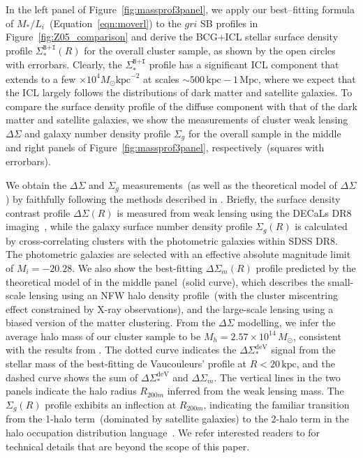 \documentclass[fleqn,usenatbib]{mnras}
\newcommand{\sigbi}{\Sigma_*^{\texttt{B+I}}}
\newcommand{\sigg}{\Sigma_g}
\newcommand{\mh}{M_h}
\newcommand{\mpc}{\mathrm{Mpc}}
\newcommand{\kpc}{\mathrm{kpc}}
\newcommand{\msol}{M_{\odot}}
\newcommand{\ds}{\Delta\Sigma}
\begin{document}
In the left panel of Figure~\ref{fig:massprof3panel}, we apply our
best--fitting formula of $M_*/L_i$~(Equation~\ref{eqn:moverl}) to the $gri$
SB profiles in Figure~\ref{fig:Z05_comparison} and derive the BCG+ICL
stellar surface density profile $\sigbi(R)$ for the overall cluster sample,
as shown by the open circles with errorbars. Clearly, the $\sigbi$ profile
has a significant ICL component that extends to a few ${\times}10^4
\msol\kpc^{-2}$ at scales ${\sim}500\,\kpc{-}1\,\mpc$, where we expect that
the ICL largely follows the distributions of dark matter and satellite
galaxies. To compare the surface density profile of the diffuse component
with that of the dark matter and satellite galaxies, we show the
measurements of cluster weak lensing $\ds$ and galaxy number density
profile $\sigg$ for the overall sample in the middle and right panels of
Figure~\ref{fig:massprof3panel}, respectively~(squares with errorbars).


We obtain the $\ds$ and $\sigg$ measurements~(as well as the theoretical
model of $\ds$) by faithfully following the methods described in
.  Briefly, the surface density contrast profile
$\ds(R)$ is measured from weak lensing using the DECaLs DR8
imaging~\citep{Dey2019}, while the galaxy surface number density profile
$\sigg(R)$ is calculated by cross-correlating clusters with the photometric
galaxies within SDSS DR8. The photometric galaxies are selected with an
effective absolute magnitude limit of $M_i{=}-20.28$. We also show the
best-fitting $\ds_m(R)$ profile predicted by the theoretical model of
 in the middle panel~(solid curve), which describes the
small-scale lensing using an NFW halo density profile~(with the cluster
miscentring effect constrained by X-ray observations), and the large-scale
lensing using a biased version of the matter clustering. From the $\ds$
modelling, we infer the average halo mass of our cluster sample to be
$\mh{=}2.57{\times}10^{14}\,\msol$, consistent with the results from
. The dotted curve indicates the $\ds_*^{\mathrm{deV}}$
signal from the stellar mass of the best-fitting de Vaucouleurs' profile at
$R{<}20\,\kpc$, and the dashed curve shows the sum of
$\ds_*^{\mathrm{deV}}$ and $\ds_m$. The vertical lines in the two panels
indicate the halo radius $R_{200m}$ inferred from the weak lensing mass.
The $\sigg(R)$ profile exhibits an inflection at $R_{200m}$, indicating the
familiar transition from the 1-halo term~(dominated by satellite galaxies)
to the 2-halo term in the halo occupation distribution
language~\citep[e.g.,][]{Zu2015}.  We refer interested readers to
 for technical details that are beyond the scope of this
paper.
\end{document}
